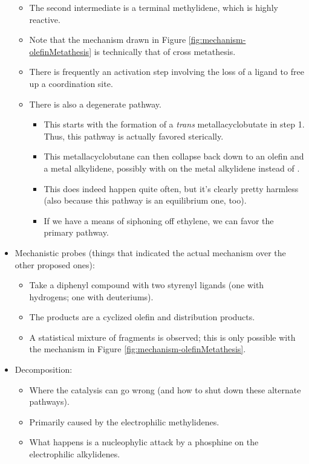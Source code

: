 \documentclass[../notes.tex]{subfiles}
\begin{document}
\begin{itemize}
\begin{itemize}
        \item The second intermediate is a terminal methylidene, which is highly reactive.
        \item Note that the mechanism drawn in Figure \ref{fig:mechanism-olefinMetathesis} is technically that of cross metathesis.
        \item There is frequently an activation step involving the loss of a ligand to free up a coordination site.
        \item There is also a degenerate pathway.
        \begin{itemize}
            \item This starts with the formation of a \emph{trans} metallacyclobutate in step 1. Thus, this pathway is actually favored sterically.
            \item This metallacyclobutane can then collapse back down to an olefin and a metal alkylidene, possibly with  on the metal alkylidene instead of .
            \item This does indeed happen quite often, but it's clearly pretty harmless (also because this pathway is an equilibrium one, too).
            \item If we have a means of siphoning off ethylene, we can favor the primary pathway.
        \end{itemize}
    \end{itemize}
    \item Mechanistic probes (things that indicated the actual mechanism over the other proposed ones):
    \begin{itemize}
        \item Take a diphenyl compound with two styrenyl ligands (one with hydrogens; one with deuteriums).
        \item The products are a cyclized olefin and distribution products.
        \item A statistical mixture of  fragments is observed; this is only possible with the mechanism in Figure \ref{fig:mechanism-olefinMetathesis}.
    \end{itemize}
    \item Decomposition:
    \begin{itemize}
        \item Where the catalysis can go wrong (and how to shut down these alternate pathways).
        \item Primarily caused by the electrophilic methylidenes.
        \item What happens is a nucleophylic attack by a phosphine on the electrophilic alkylidenes.

\end{itemize}
\end{itemize}
\end{document}
